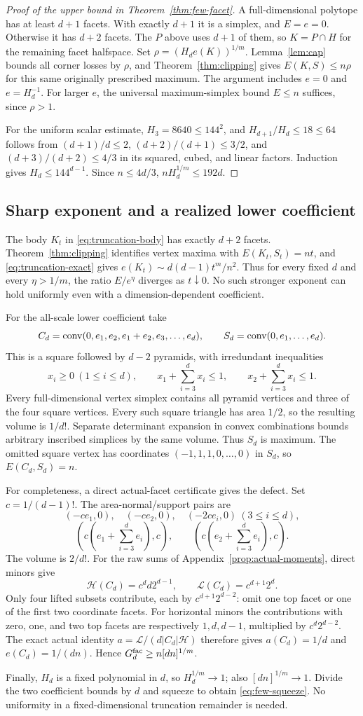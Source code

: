 \begin{proof}[Proof of the upper bound in Theorem~\ref{thm:few-facet}]
A full-dimensional polytope has at least $d+1$ facets. With exactly $d+1$
it is a simplex, and $E=e=0$. Otherwise it has $d+2$ facets. The $P$
above uses $d+1$ of them, so $K=P\cap H$ for the remaining facet
halfspace. Set $\rho=(H_de(K))^{1/m}$. Lemma~\ref{lem:cap} bounds all
corner losses by $\rho$, and Theorem~\ref{thm:clipping} gives
$E(K,S)\le n\rho$ for this same originally prescribed maximum.
The argument includes $e=0$ and $e=H_d^{-1}$. For larger $e$, the universal
maximum-simplex bound $E\le n$ suffices, since $\rho>1$.

For the uniform scalar estimate, $H_3=8640\le144^2$, and
$H_{d+1}/H_d\le18\le64$ follows from
$(d+1)/d\le2$, $(d+2)/(d+1)\le3/2$, and
$(d+3)/(d+2)\le4/3$ in its squared, cubed, and linear factors.
Induction gives $H_d\le144^{d-1}$. Since $n\le4d/3$,
$nH_d^{1/m}\le192d$.
\end{proof}

\subsection{Sharp exponent and a realized lower coefficient}
The body $K_t$ in \eqref{eq:truncation-body} has exactly $d+2$ facets.
Theorem~\ref{thm:clipping} identifies vertex maxima with
$E(K_t,S_t)=nt$, and \eqref{eq:truncation-exact} gives
$e(K_t)\sim d(d-1)t^m/n^2$. Thus for every fixed $d$ and every
$\eta>1/m$, the ratio $E/e^\eta$ diverges as $t\downarrow0$.
No such stronger exponent can hold uniformly even with a
dimension-dependent coefficient.

For the all-scale lower coefficient take
\[
 C_d=\operatorname{conv}(0,e_1,e_2,e_1+e_2,e_3,\ldots,e_d),\qquad
 S_d=\operatorname{conv}(0,e_1,\ldots,e_d).
\]
This is a square followed by $d-2$ pyramids, with irredundant inequalities
\[
 x_i\ge0\ (1\le i\le d),\qquad
 x_1+\sum_{i=3}^dx_i\le1,\qquad x_2+\sum_{i=3}^dx_i\le1.
\]
Every full-dimensional vertex simplex contains all pyramid vertices and
three of the four square vertices. Every such square triangle has area
$1/2$, so the resulting volume is $1/d!$. Separate determinant expansion
in convex combinations bounds arbitrary inscribed simplices by the same
volume. Thus $S_d$ is maximum. The omitted square vertex has coordinates
$(-1,1,1,0,\ldots,0)$ in $S_d$, so $E(C_d,S_d)=n$.

For completeness, a direct actual-facet certificate gives the defect.
Set $c=1/(d-1)!$. The area-normal/support pairs are
\[
 (-ce_1,0),\quad(-ce_2,0),\quad(-2ce_i,0)\ (3\le i\le d),
\]
\[
 \left(c\left(e_1+\sum_{i=3}^de_i\right),c\right),\qquad
 \left(c\left(e_2+\sum_{i=3}^de_i\right),c\right).
\]
The volume is $2/d!$. For the raw sums of
Appendix~\ref{prop:actual-moments}, direct minors give
\[
 \mathcal H(C_d)=c^d d2^{d-1},\qquad
 \mathcal L(C_d)=c^{d+1}2^d.
\]
Only four lifted subsets contribute, each by $c^{d+1}2^{d-2}$:
omit one top facet or one of the first two coordinate facets.
For horizontal minors the contributions with zero, one, and two top
facets are respectively $1,d,d-1$, multiplied by $c^d2^{d-2}$.
The exact actual identity $a=\mathcal L/(d|C_d|\mathcal H)$ therefore
gives $a(C_d)=1/d$ and $e(C_d)=1/(dn)$. Hence
$G_d^{\rm fac}\ge n[dn]^{1/m}$.

Finally, $H_d$ is a fixed polynomial in $d$, so $H_d^{1/m}\to1$;
also $[dn]^{1/m}\to1$. Divide the two coefficient bounds by $d$ and
squeeze to obtain \eqref{eq:few-squeeze}. No uniformity in a
fixed-dimensional truncation remainder is needed.
